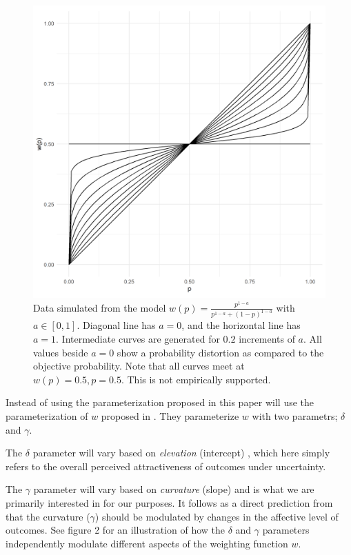 \documentclass[12pt]{article}
\begin{document}
\begin{figure}[h!]
	\includegraphics[width = \linewidth]{../Figures/oneParam.png}
	\caption{Data simulated from the model
		$w(p) = \frac{p^{1-a}}
		{p^{1-a}+(1-p)^{1-a}}$ with
		$a \in [0, 1]$. Diagonal line has
		$a = 0$, and the horizontal line
		has $a = 1$. Intermediate curves
		are generated for $0.2$ increments
		of $a$. All values beside
		$a = 0$ show a probability distortion
		as compared to the objective probability.
		Note that all curves meet at
		$w(p) = 0.5, p = 0.5$. This is
	not empirically supported.}
\end{figure}

Instead of using the parameterization
proposed in \textcite{rottenstreich2001money}
this paper will use the parameterization
of $w$ proposed in \textcite{gonzalez1999shape}.
They parameterize $w$ with two parametrs;
$\delta$ and $\gamma$.

\vspace{3mm}

The $\delta$ parameter will vary based on
\emph{elevation} (intercept)
\autocite{gonzalez1999shape},
which here simply refers to the overall
perceived attractiveness of outcomes
under uncertainty.

\vspace{3mm}

The $\gamma$ parameter will vary based on
\emph{curvature} (slope)
\autocite{gonzalez1999shape} and is what we
are primarily interested in for our purposes.
It follows as a direct prediction from
\textcite{rottenstreich2001money} that the
curvature ($\gamma$) should be modulated by changes in
the affective level of outcomes. See
figure 2 for an illustration of how the $\delta$
and $\gamma$ parameters independently modulate
different aspects of the weighting function $w$.
\end{document}
